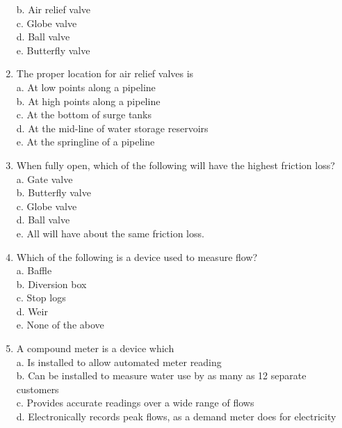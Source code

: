 \documentclass{article}
\begin{document}
\begin{enumerate}[1.]
b. Air relief valve\\

c. Globe valve\\

d. Ball valve\\

e. Butterfly valve\\

  \item The proper location for air relief valves is\\
a. At low points along a pipeline\\
b. At high points along a pipeline\\
c. At the bottom of surge tanks\\
d. At the mid-line of water storage reservoirs\\
e. At the springline of a pipeline\\

  \item When fully open, which of the following will have the highest friction loss?\\
a. Gate valve\\
b. Butterfly valve\\
c. Globe valve\\
d. Ball valve\\
e. All will have about the same friction loss.\\

  \item Which of the following is a device used to measure flow?\\
a. Baffle\\
b. Diversion box\\
c. Stop logs\\
d. Weir\\
e. None of the above 

\item A compound meter is a device which\\
a. Is installed to allow automated meter reading\\

b. Can be installed to measure water use by as many as 12 separate customers\\

c. Provides accurate readings over a wide range of flows\\

d. Electronically records peak flows, as a demand meter does for electricity\\


\end{enumerate}
\end{document}
